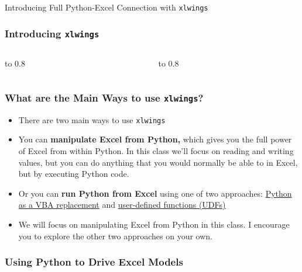 \documentclass[handout, 11pt]{beamer}
\begin{document}
\begin{section}{Introducing Full Python-Excel Connection with \texttt{xlwings}}
\begin{frame}
\frametitle{Introducing \texttt{xlwings}}
\begin{columns}
\begin{column}{0.5\textwidth}
\vbox to 0.8
\end{column}
\begin{column}{0.5\textwidth}
\vbox to 0.8
\end{column}
\end{columns}
\end{frame}
\begin{frame}
\frametitle{What are the Main Ways to use \texttt{xlwings}?}
\begin{itemize}
\item There are two main ways to use
\texttt{xlwings}
\vfill
\item You can
\textbf{manipulate Excel from Python,}
which gives you the full power of Excel from
within Python. In this class we'll focus on reading and writing values, but you can do anything
that you would normally be able to in Excel, but by executing Python code.
\vfill
\item Or you can
\textbf{run Python from Excel}
using one of two approaches:
\underline{Python as a VBA replacement}
and
\underline{user-defined functions (UDFs)}
\vfill
\item We will focus on manipulating Excel from Python in this class. I encourage you to explore the other two approaches on your own.
\end{itemize}
\end{frame}
\begin{frame}
\frametitle{Using Python to Drive Excel Models}
\begin{columns}

\end{columns}
\end{frame}
\end{section}
\end{document}

